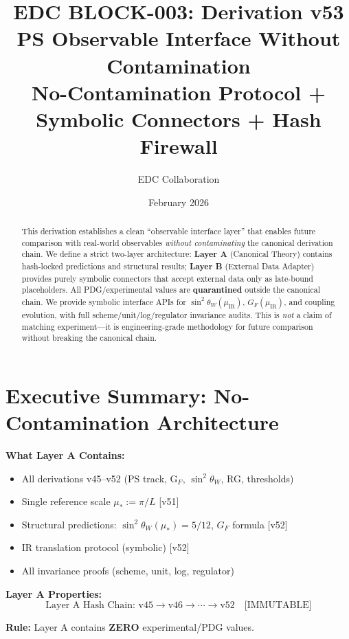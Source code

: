 \documentclass[11pt,a4paper]{article}
\title{\textbf{EDC BLOCK-003: Derivation v53}\\[0.5em]
\Large PS Observable Interface Without Contamination\\[0.3em]
\large No-Contamination Protocol + Symbolic Connectors + Hash Firewall}
\author{EDC Collaboration}
\date{February 2026}
\theoremstyle{definition}
\begin{document}
\maketitle

\begin{abstract}
This derivation establishes a clean ``observable interface layer'' that enables future comparison
with real-world observables \emph{without contaminating} the canonical derivation chain. We define
a strict two-layer architecture: \textbf{Layer A} (Canonical Theory) contains hash-locked predictions
and structural results; \textbf{Layer B} (External Data Adapter) provides purely symbolic connectors
that accept external data only as late-bound placeholders. All PDG/experimental values are
\textbf{quarantined} outside the canonical chain. We provide symbolic interface APIs for
$\sin^2\theta_W(\mu_{\text{IR}})$, $G_F(\mu_{\text{IR}})$, and coupling evolution, with full
scheme/unit/log/regulator invariance audits. This is \emph{not} a claim of matching experiment---it
is engineering-grade methodology for future comparison without breaking the canonical chain.
\end{abstract}


\section*{Executive Summary: No-Contamination Architecture}
\label{sec:executive}

\begin{layerabox}
\textbf{What Layer A Contains:}
\begin{itemize}
\item All derivations v45--v52 (PS track, G$_F$, $\sin^2\theta_W$, RG, thresholds)
\item Single reference scale $\mu_* := \pi/L$ [v51]
\item Structural predictions: $\sin^2\theta_W(\mu_*) = 5/12$, $G_F$ formula [v52]
\item IR translation protocol (symbolic) [v52]
\item All invariance proofs (scheme, unit, log, regulator)
\end{itemize}

\textbf{Layer A Properties:}
\begin{equation}
\label{eq:layer_a_hash}
\text{Layer A Hash Chain: v45} \to \text{v46} \to \cdots \to \text{v52} \quad \text{[IMMUTABLE]}
\end{equation}

\textbf{Rule:} Layer A contains \textbf{ZERO} experimental/PDG values.
\end{layerabox}
\end{document}
